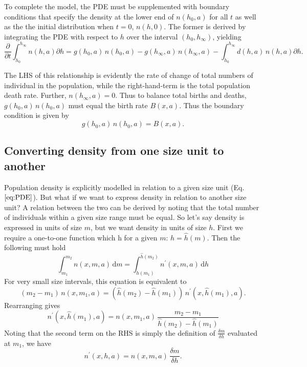 \documentclass[10pt,twoside]{article}
\begin{document}
To complete the model, the PDE must be supplemented with boundary
conditions that specify the density at the lower end of \(n(h_{0},a)\)
for all \(t\) as well as the the initial distribution when \(t=0\),
\(n(h,0)\). The former is derived by integrating the PDE with respect to
\(h\) over the interval \((h_{0},h_{\infty })\), yielding
\begin{equation}\frac{\partial }{\partial t} \int _{h_{0} }^{h_{\infty } }n(h,a) \partial h=g(h_{0} ,a) \, n(h_{0} ,a)-g(h_{\infty } ,a) \, n(h_{\infty } ,a)-\int _{h_{0} }^{h_{\infty } }d (h,a) \, n(h,a) \partial h.
\end{equation}

The LHS of this relationship is evidently the rate of change of total
numbers of individual in the population, while the right-hand-term is
the total population death rate. Further, \(n(h_{\infty } ,a)=0\). Thus
to balance total births and deaths, \(g(h_{0} ,a) \, n(h_{0} ,a)\) must
equal the birth rate \(B(x, a)\). Thus the boundary condition is given
by
\begin{equation}g(h_{0} ,a) \, n(h_{0} ,a)=B(x, a).
\end{equation}

\subsection{Converting density from one size unit to
another}\label{converting-density-from-one-size-unit-to-another}

Population density is explicitly modelled in relation to a given size
unit (Eq. \(\ref{eq:PDE}\)). But what if we want to express density in
relation to another size unit? A relation between the two can be derived
by noting that the total number of individuals within a given size range
must be equal. So let's say density is expressed in units of size \(m\),
but we want density in units of size \(h\). First we require a
one-to-one function which h for a given \(m\): \(h = \hat{h}(m)\). Then
the following must hold
\begin{equation} \label{eq:n_conversion} \int_{m_1}^{m_2} n(x,m,a) \, \textrm{d}m =  \int_{\hat{h}(m_1)}^{\hat{h}(m_2)} n^\prime(x,m,a) \, \textrm{d}h
\end{equation}
For very small size intervals, this equation is equivalent to
\begin{equation} \left(m_2- m_1 \right) \, n(x,m_1,a) = \left( \hat{h}(m_2) - \hat{h}(m_1)\right) \, n^\prime(x, \hat{h}(m_1),a).
\end{equation}
Rearranging gives
\begin{equation}  n^\prime(x, \hat{h}(m_1),a) = n(x, m_1,a) \, \frac{m_2- m_1}{\hat{h}(m_2) - \hat{h}(m_1)}
\end{equation}
Noting that the second term on the RHS is simply the definition of
\(\frac{\delta m}{\delta h}\) evaluated at \(m_1\), we have
\begin{equation} \label{eq:n_conversion2} n^\prime(x, h, a) = n(x, m,a) \, \frac{\delta m}{\delta h}.
\end{equation}

\clearpage

\end{document}
